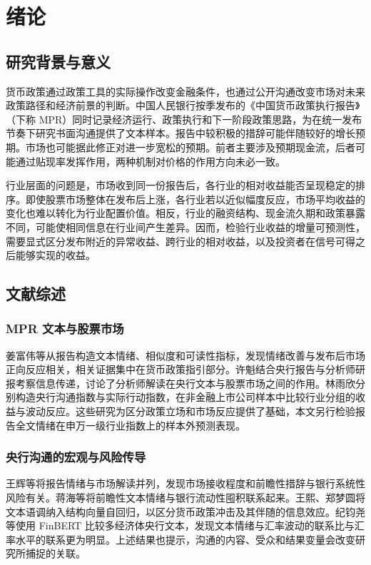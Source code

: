\section{绪论}
\label{sec:introduction}

\subsection{研究背景与意义}

货币政策通过政策工具的实际操作改变金融条件，也通过公开沟通改变市场对未来政策路径和经济前景的判断。中国人民银行按季发布的《中国货币政策执行报告》（下称 MPR）同时记录经济运行、政策执行和下一阶段政策思路，为在统一发布节奏下研究书面沟通提供了文本样本。报告中较积极的措辞可能伴随较好的增长预期。市场也可能据此修正对进一步宽松的预期。前者主要涉及预期现金流，后者可能通过贴现率发挥作用，两种机制对价格的作用方向未必一致。

行业层面的问题是，市场收到同一份报告后，各行业的相对收益能否呈现稳定的排序。即使股票市场整体在发布后上涨，各行业若以近似幅度反应，市场平均收益的变化也难以转化为行业配置价值。相反，行业的融资结构、现金流久期和政策暴露不同，可能使相同信息在行业间产生差异。因而，检验行业收益的增量可预测性，需要显式区分发布附近的异常收益、跨行业的相对收益，以及投资者在信号可得之后能够实现的收益。

\subsection{文献综述}

\subsubsection{MPR 文本与股票市场}
姜富伟等从报告构造文本情绪、相似度和可读性指标，发现情绪改善与发布后市场正向反应相关，相关证据集中在货币政策指引部分\cite{jiangHuHuang2021}。许魁结合央行报告与分析师研报考察信息传递，讨论了分析师解读在央行文本与股票市场之间的作用\cite{xuKui2023}。林雨欣分别构造央行沟通指数与实际行动指数，在非金融上市公司样本中比较行业分组的收益与波动反应\cite{linYuxin2025}。这些研究为区分政策立场和市场反应提供了基础，本文另行检验报告全文情绪在申万一级行业指数上的样本外预测表现。

\subsubsection{央行沟通的宏观与风险传导}
王辉等将报告情绪与市场解读并列，发现市场接收程度和前瞻性措辞与银行系统性风险有关\cite{wangZhuHu2023}。蒋海等将前瞻性文本情绪与银行流动性囤积联系起来\cite{jiangSunLi2025}。王熙、郑梦圆将文本语调纳入结构向量自回归，以区分货币政策冲击及其伴随的信息效应\cite{wangZheng2021}。纪钧尧等使用 FinBERT 比较多经济体央行文本，发现文本情绪与汇率波动的联系比与汇率水平的联系更为明显\cite{jiYouChen2026}。上述结果也提示，沟通的内容、受众和结果变量会改变研究所捕捉的关联。

